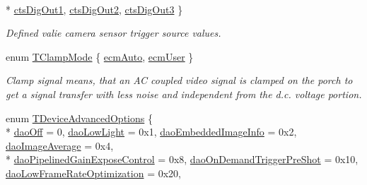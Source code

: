 \begin{DoxyCompactItemize}
\\*
\hyperlink{group___device_specific_interface_gga18243d80e95a98e9596ed83ed96cdb54adb2a7247120e4ed497d65be49b685a77}{cts\+Dig\+Out1}, 
\hyperlink{group___device_specific_interface_gga18243d80e95a98e9596ed83ed96cdb54a5f40b064c21fbd0bbba6f6db0201acf4}{cts\+Dig\+Out2}, 
\hyperlink{group___device_specific_interface_gga18243d80e95a98e9596ed83ed96cdb54a8f56f13fe6c448a76510671f8dd86a8d}{cts\+Dig\+Out3}
 \}
\begin{DoxyCompactList}\small\item\em Defined valie camera sensor trigger source values. \end{DoxyCompactList}\item 
enum \hyperlink{group___device_specific_interface_gad42717c53ece3c90f468265fd0267ad2}{T\+Clamp\+Mode} \{ \hyperlink{group___device_specific_interface_ggad42717c53ece3c90f468265fd0267ad2a44fbd875ec78a42a2afd92455879587f}{ecm\+Auto}, 
\hyperlink{group___device_specific_interface_ggad42717c53ece3c90f468265fd0267ad2a2c14ee7626cd836d276a33655442c0b8}{ecm\+User}
 \}
\begin{DoxyCompactList}\small\item\em Clamp signal means, that an A\+C coupled video signal is clamped on the porch to get a signal transfer with less noise and independent from the d.\+c. voltage portion. \end{DoxyCompactList}\item 
enum \hyperlink{group___device_specific_interface_gad8cdd91ea42682e1055b0fb168f2ea58}{T\+Device\+Advanced\+Options} \{ \\*
\hyperlink{group___device_specific_interface_ggad8cdd91ea42682e1055b0fb168f2ea58a76cc85db9f44100a2ffd3f1a63a89663}{dao\+Off} = 0, 
\hyperlink{group___device_specific_interface_ggad8cdd91ea42682e1055b0fb168f2ea58a6822ce1dd00bd3b697867d307e00189a}{dao\+Low\+Light} = 0x1, 
\hyperlink{group___device_specific_interface_ggad8cdd91ea42682e1055b0fb168f2ea58aab22041b818c06f127943e6fae42d3c6}{dao\+Embedded\+Image\+Info} = 0x2, 
\hyperlink{group___device_specific_interface_ggad8cdd91ea42682e1055b0fb168f2ea58a5796983939172a3cee0f3d8e4402a220}{dao\+Image\+Average} = 0x4, 
\\*
\hyperlink{group___device_specific_interface_ggad8cdd91ea42682e1055b0fb168f2ea58adc54a7e1840996eb23af122780484d15}{dao\+Pipelined\+Gain\+Expose\+Control} = 0x8, 
\hyperlink{group___device_specific_interface_ggad8cdd91ea42682e1055b0fb168f2ea58a8e2474c8cd7a8015d14b8487f0550daa}{dao\+On\+Demand\+Trigger\+Pre\+Shot} = 0x10, 
\hyperlink{group___device_specific_interface_ggad8cdd91ea42682e1055b0fb168f2ea58a5761cf2d2824c3413e13e5de485d62be}{dao\+Low\+Frame\+Rate\+Optimization} = 0x20, 

\end{DoxyCompactItemize}
